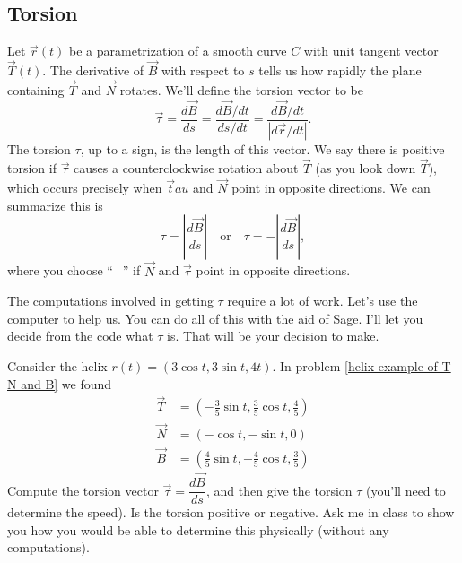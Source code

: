 \subsection{Torsion}

\begin{definition}[Torsion]
 Let $\vec r(t)$ be a parametrization of a smooth curve $C$ with unit tangent vector $\vec T(t)$.  
 The derivative of $\vec B$ with respect to $s$ tells us how rapidly the plane containing $\vec T$ and $\vec N$ rotates. We'll define the torsion vector to be 
%
 $$\vec \tau = \dfrac{d\vec B}{ds} = \dfrac{d\vec B/dt}{ds/dt}=\dfrac{d\vec B/dt}{|d\vec r/dt|}.$$ 
 The torsion $\tau$, up to a sign, is the length of this vector. We say there is positive torsion if $\vec \tau$ causes a counterclockwise rotation about $\vec T$ (as you look down $\vec T$), which occurs precisely when $\vec tau$ and $\vec N$ point in opposite directions. We can summarize this is $$\tau=\left|\dfrac{d\vec B}{ds}\right|\quad \text{or}\quad \tau=-\left|\dfrac{d\vec B}{ds}\right|,$$ where you choose ``$+$'' if $\vec N$ and $\vec \tau$ point in opposite directions. 
\end{definition}


The computations involved in getting $\tau$ require a lot of work. Let's use the computer to help us. You can do all of this with the aid of Sage.  I'll let you decide from the code what $\tau$ is.  That will be your decision to make. 

\begin{problem}
%
Consider the helix $r(t)=(3\cos t, 3\sin t, 4t)$. In problem \ref{helix example of T N and B} we found 
\begin{align*}
 \vec T &= (-\frac{3}{5}\sin t,\frac{3}{5}\cos t,\frac{4}{5})\\
 \vec N &= (-\cos t,-\sin t,0)\\
 \vec B &= (\frac{4}{5}\sin t,-\frac{4}{5}\cos t,\frac{3}{5})
\end{align*}
Compute the torsion vector $\vec \tau=\dfrac{d\vec B}{ds}$, and then give the torsion $\tau$ (you'll need to determine the speed).  Is the torsion positive or negative.  Ask me in class to show you how you would be able to determine this physically (without any computations).
\end{problem}

